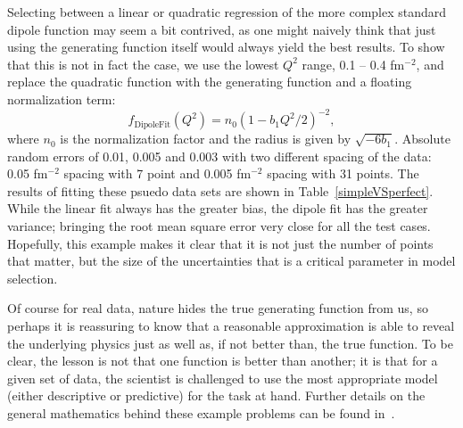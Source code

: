 \documentclass[10pt,aps,prc,twocolumn]{revtex4-1}
\begin{document}
Selecting between a linear or quadratic regression of the more complex standard dipole function may seem 
a bit contrived, as one might naively think that just using the generating function itself would always yield the
best results.   To show that this is not in fact the case, 
we use the lowest $Q^2$ range, 0.1 -- 0.4 fm$^{-2}$, and replace the quadratic function 
with the generating function and a floating normalization term:
\begin{equation}
\label{eq:fitdipole}
f_{{\mathrm{Dipole Fit}}}(Q^2) =  n_0 ( 1 - b_1 Q^2 / 2)^{-2},
\end{equation}
where $n_0$ is the normalization factor and the radius is given by $\sqrt{-6 b_1}$.
Absolute random errors of 0.01, 0.005 and 0.003 with two different spacing of the data: 
0.05 fm$^{-2}$ spacing with 7 point and 0.005 fm$^{-2}$ 
spacing with 31 points.       
The results of fitting these psuedo data sets are shown in Table~\ref{simpleVSperfect}.    
While the linear fit always has the greater bias, the dipole fit has the greater 
variance; bringing the root mean square error very close for all the test cases.   
Hopefully, this example makes it clear that it is not just the number of points that matter, 
but the size of the uncertainties that is a critical parameter in model selection.

Of course for real data, nature hides the true generating function from us, so perhaps it is reassuring to know
that a reasonable approximation is able to reveal the underlying physics just as well as, if not better than, the
true function.   
To be clear, the lesson is not that one function is better than another; it is that for a given set of data,
the scientist is challenged to use the most appropriate model (either descriptive or predictive) for
the task at hand.   Further details on the general mathematics behind these example problems can be 
found in~\cite{Shmueli:2010}.    
\end{document}
